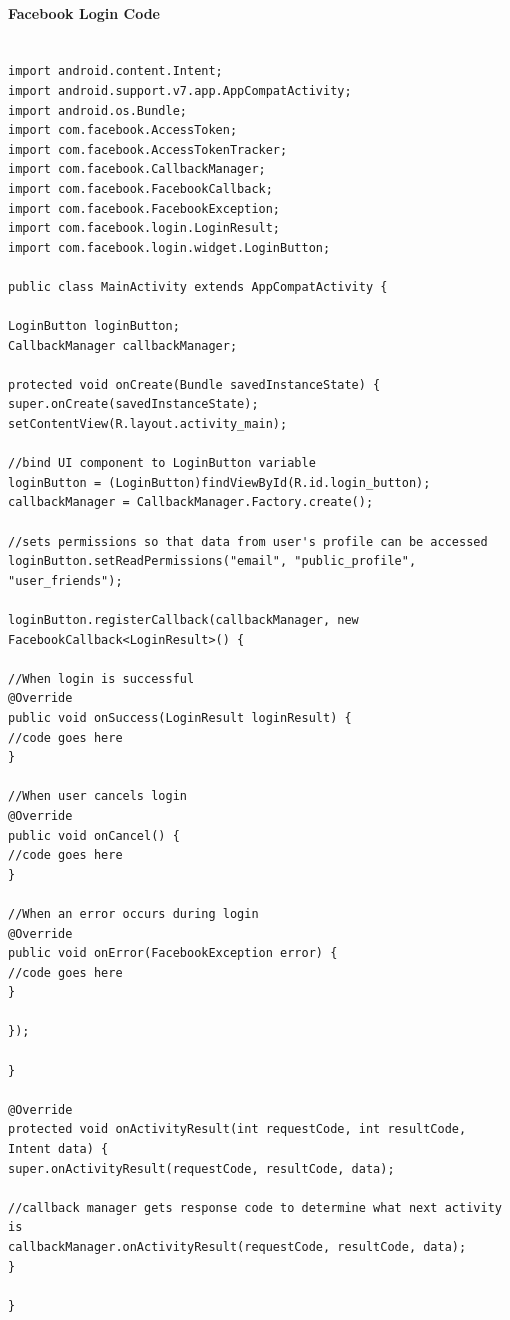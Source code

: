 ﻿\documentclass{article}
\begin{document}
\paragraph{Facebook Login Code}
\begin{lstlisting}

import android.content.Intent;
import android.support.v7.app.AppCompatActivity;
import android.os.Bundle;
import com.facebook.AccessToken;
import com.facebook.AccessTokenTracker;
import com.facebook.CallbackManager;
import com.facebook.FacebookCallback;
import com.facebook.FacebookException;
import com.facebook.login.LoginResult;
import com.facebook.login.widget.LoginButton;

public class MainActivity extends AppCompatActivity {

LoginButton loginButton;
CallbackManager callbackManager;

protected void onCreate(Bundle savedInstanceState) {
super.onCreate(savedInstanceState);
setContentView(R.layout.activity_main);

//bind UI component to LoginButton variable
loginButton = (LoginButton)findViewById(R.id.login_button);
callbackManager = CallbackManager.Factory.create();

//sets permissions so that data from user's profile can be accessed
loginButton.setReadPermissions("email", "public_profile", "user_friends");

loginButton.registerCallback(callbackManager, new FacebookCallback<LoginResult>() {

//When login is successful
@Override
public void onSuccess(LoginResult loginResult) {
//code goes here
}

//When user cancels login
@Override
public void onCancel() {
//code goes here
}

//When an error occurs during login
@Override
public void onError(FacebookException error) {
//code goes here
}

});

}

@Override
protected void onActivityResult(int requestCode, int resultCode, Intent data) {
super.onActivityResult(requestCode, resultCode, data);

//callback manager gets response code to determine what next activity is
callbackManager.onActivityResult(requestCode, resultCode, data);
}

}

\end{lstlisting}
\end{document}
